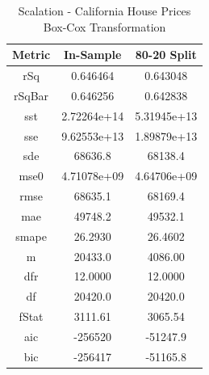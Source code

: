 \documentclass{article}
\begin{document}
\begin{table}[H]
\centering
\caption{Scalation - California House Prices Box-Cox Transformation}
\label{tab:Scalation - House Prices Box-Cox Transformation}
\begin{tabular}{|c|c|c|} \hline 
Metric & In-Sample & 80-20 Split \\ \hline \hline 
rSq &0.646464 & 0.643048 \\ \hline 
rSqBar &0.646256 &      0.642838 \\ \hline 
sst &2.72264e+14 &      5.31945e+13 \\ \hline 
sse &9.62553e+13 &      1.89879e+13 \\ \hline 
sde &68636.8 &  68138.4 \\ \hline 
mse0 &4.71078e+09 &     4.64706e+09 \\ \hline 
rmse &68635.1 & 68169.4 \\ \hline 
mae &49748.2 &  49532.1 \\ \hline 
smape &26.2930 &        26.4602 \\ \hline 
m &20433.0 &    4086.00 \\ \hline 
dfr &12.0000 &  12.0000 \\ \hline 
df &20420.0 &   20420.0 \\ \hline 
fStat &3111.61 &        3065.54 \\ \hline 
aic &-256520 &  -51247.9 \\ \hline 
bic &-256417 &  -51165.8 \\ \hline 
\end{tabular}
\end{table}
\end{document}
